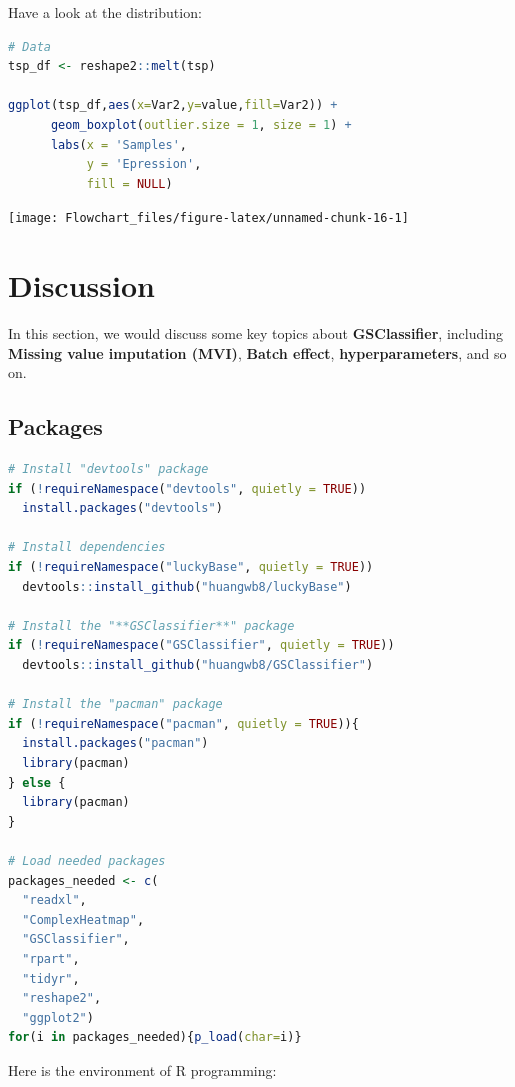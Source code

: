 \documentclass[
  12pt,
]{book}
\begin{document}
Have a look at the distribution:

\begin{lstlisting}[language=R]
# Data
tsp_df <- reshape2::melt(tsp)

ggplot(tsp_df,aes(x=Var2,y=value,fill=Var2)) + 
      geom_boxplot(outlier.size = 1, size = 1) + 
      labs(x = 'Samples',
           y = 'Epression',
           fill = NULL) 
\end{lstlisting}

\begin{center}\texttt{[image: Flowchart\_files/figure-latex/unnamed-chunk-16-1]} \end{center}

\hypertarget{discussion}{%
\chapter{Discussion}\label{discussion}}

In this section, we would discuss some key topics about \textbf{GSClassifier}, including \textbf{Missing value imputation (MVI)}, \textbf{Batch effect}, \textbf{hyperparameters}, and so on.

\hypertarget{packages-1}{%
\section{Packages}\label{packages-1}}

\begin{lstlisting}[language=R]
# Install "devtools" package
if (!requireNamespace("devtools", quietly = TRUE))
  install.packages("devtools")

# Install dependencies
if (!requireNamespace("luckyBase", quietly = TRUE))
  devtools::install_github("huangwb8/luckyBase")

# Install the "**GSClassifier**" package
if (!requireNamespace("GSClassifier", quietly = TRUE))
  devtools::install_github("huangwb8/GSClassifier")

# Install the "pacman" package
if (!requireNamespace("pacman", quietly = TRUE)){
  install.packages("pacman")
  library(pacman)
} else {
  library(pacman)
}

# Load needed packages
packages_needed <- c(
  "readxl",
  "ComplexHeatmap",
  "GSClassifier",
  "rpart",
  "tidyr",
  "reshape2",
  "ggplot2")
for(i in packages_needed){p_load(char=i)}
\end{lstlisting}

Here is the environment of R programming:
\end{document}
